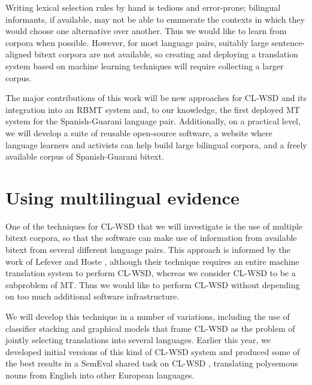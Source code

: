 \documentclass{article}
\begin{document}
Writing lexical selection rules by hand is tedious and error-prone; bilingual
informants, if available, may not be able to enumerate the contexts in which
they would choose one alternative over another. Thus we would like to learn
from corpora when possible. However, for most language pairs, suitably large
sentence-aligned bitext corpora are not available, so creating and deploying a
translation system based on machine learning techniques will require collecting
a larger corpus.


The major contributions of this work will be new approaches for CL-WSD
and its integration into an RBMT system and, to our knowledge, the first
deployed MT system for the Spanish-Guarani language pair. Additionally, on a
practical level, we will develop a suite of reusable open-source
software, a website where language learners and activists can help build large
bilingual corpora, and a freely available corpus of Spanish-Guarani bitext.

\section{Using multilingual evidence}
One of the techniques for CL-WSD that we will investigate is the use of
multiple bitext corpora, so that the software can make use of information from
available bitext from several different language pairs. This approach is
informed by the work of Lefever and Hoste
\cite{lefever-hoste-decock:2011:ACL-HLT2011}, although their technique requires
an entire machine translation system to perform CL-WSD, whereas we consider
CL-WSD to be a subproblem of MT. Thus we would like to perform CL-WSD without
depending on too much additional software infrastructure.

We will develop this technique in a number of variations, including the use of
classifier stacking and graphical models that frame CL-WSD as the problem
of jointly selecting translations into several languages. Earlier this year,
we developed initial versions of this kind of CL-WSD system
\cite{rudnick-liu-gasser:2013:SemEval-2013} and produced some of the best
results in a SemEval shared task on CL-WSD \cite{task10},
translating polysemous nouns from English into other European languages.
\end{document}
